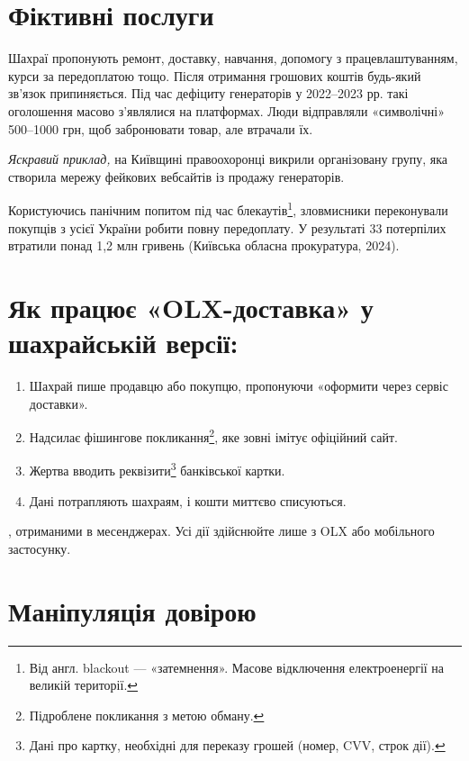 \vspace{0.3cm}
\section{Фіктивні послуги}

Шахраї пропонують ремонт, доставку, навчання, допомогу з працевлаштуванням, курси за передоплатою тощо. Після отримання грошових коштів будь-який зв’язок припиняється. Під час дефіциту генераторів у 2022–2023 рр. такі оголошення масово з’являлися на платформах. Люди відправляли «символічні» 500–1000 грн, щоб забронювати товар, але втрачали їх.

\textit{Яскравий приклад,} на Київщині правоохоронці викрили організовану групу, яка створила мережу фейкових вебсайтів із продажу генераторів. 

Користуючись панічним попитом під час блекаутів\footnote{Від англ. blackout — «затемнення». Масове відключення електроенергії на великій території.}, зловмисники переконували покупців з усієї України робити повну передоплату. У результаті 33 потерпілих втратили понад 1,2 млн гривень (Київська обласна прокуратура, 2024).

\vspace{0.3cm}
\section{Як працює «OLX-доставка» у шахрайській версії:}

\begin{enumerate}
    \item Шахрай пише продавцю або покупцю, пропонуючи «оформити через сервіс доставки».
    \item Надсилає фішингове покликання\footnote{Підроблене покликання з метою обману.}, яке зовні імітує офіційний сайт.
    \item Жертва вводить реквізити\footnote{Дані про картку, необхідні для переказу грошей (номер, CVV, строк дії).} банківської картки.
    \item Дані потрапляють шахраям, і кошти миттєво списуються.
\end{enumerate}

 , отриманими в месенджерах. Усі дії здійснюйте лише з  OLX або мобільного застосунку.

\vspace{0.3cm}
\section{Маніпуляція довірою}

